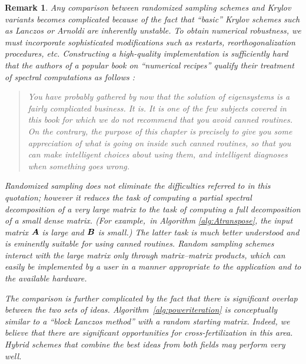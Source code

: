 \documentclass[final]{siamltex}
\newtheorem{remark}{Remark}[section]
\begin{document}
\begin{remark} \rm
Any comparison between randomized sampling schemes and Krylov variants
becomes complicated because of the fact that ``basic'' Krylov schemes such
as Lanczos \cite[p.~473]{golub} or Arnoldi \cite[p.~499]{golub}
are inherently unstable. To obtain numerical robustness, we must incorporate
sophisticated modifications such as restarts, reorthogonalization procedures, etc.
Constructing a high-quality implementation is sufficiently hard that the authors
of a popular book on ``numerical recipes''
qualify their treatment of spectral computations as follows
\cite[p.~567]{2007_numerical_recipes}:

\lsp

\begin{quotation}
\noindent
You have probably gathered by now that the solution of eigensystems is a fairly complicated business.
It is. It is one of the few subjects covered in this book for which we do \emph{not} recommend that you avoid
canned routines. On the contrary, the purpose of this chapter is precisely to give you some appreciation of what
is going on inside such canned routines, so that you can make intelligent choices about using them, and intelligent
diagnoses when something goes wrong.
\end{quotation}

\lsp

\noindent
Randomized sampling does not eliminate the difficulties referred to in this quotation;
however it reduces the task of computing a \emph{partial} spectral decomposition
of a very large matrix to the task of computing a \emph{full} decomposition of
a small dense matrix.  (For example,~in Algorithm \ref{alg:Atranspose}, the input matrix
$\bm{A}$ is large and $\bm{B}$ is small.) The latter task is much better understood
and is eminently suitable for using canned routines.  Random sampling schemes
interact with the large matrix only through matrix--matrix products, which can
easily be implemented by a user in a manner appropriate to the application
and to the available hardware.


The comparison is further complicated by the fact that there is significant
overlap between the two sets of ideas. Algorithm~\ref{alg:poweriteration} is
conceptually similar to a ``block Lanczos method'' \cite[p.~485]{golub} with a random starting matrix.
Indeed, we believe that there are significant opportunities for cross-fertilization
in this area.  Hybrid schemes that combine the best ideas from both
fields may perform very well.
\end{remark}
\end{document}
